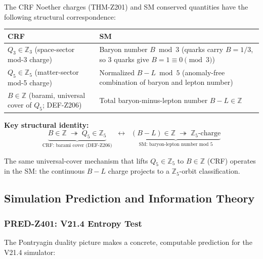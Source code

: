 \documentclass[12pt, a4paper]{article}
\begin{document}
\begin{keybox}[title={Conservation Law Identification (ID-Z401)}]
The CRF Noether charges (THM-Z201) and SM conserved quantities
have the following structural correspondence:

{\small
\renewcommand{\arraystretch}{1.30}
\begin{tabular}{p{4cm} p{7.5cm}}
\toprule
\textbf{CRF} & \textbf{SM}\\
\midrule
$Q_3 \in \mathbb{Z}_3$ (space-sector mod-3 charge)
  & Baryon number $B \bmod 3$
    (quarks carry $B = 1/3$, so 3 quarks give
    $B = 1 \equiv 0 \pmod{3}$) \\[4pt]
$Q_5 \in \mathbb{Z}_5$ (matter-sector mod-5 charge)
  & Normalized $B-L \bmod 5$
    (anomaly-free combination of baryon and lepton number) \\[4pt]
$B \in \mathbb{Z}$ (barami, universal cover of $Q_5$; DEF-Z206)
  & Total baryon-minus-lepton number $B-L \in \mathbb{Z}$ \\
\bottomrule
\end{tabular}
}

\textbf{Key structural identity:}
$$\underbrace{B \in \mathbb{Z} \;\twoheadrightarrow\; Q_5 \in \mathbb{Z}_5}_{\text{CRF: barami cover (DEF-Z206)}}
\;\;\longleftrightarrow\;\;
\underbrace{(B-L) \in \mathbb{Z} \;\twoheadrightarrow\; \mathbb{Z}_5\text{-charge}}_{\text{SM: baryon-lepton number mod 5}}$$

The same universal-cover mechanism that lifts $Q_5 \in \mathbb{Z}_5$
to $B \in \mathbb{Z}$ (CRF) operates in the SM: the continuous
$B-L$ charge projects to a $\mathbb{Z}_5$-orbit classification.
\end{keybox}

\subsection{Simulation Prediction and Information Theory}
\label{sec:prediction}

\subsubsection{PRED-Z401: V21.4 Entropy Test}

The Pontryagin duality picture makes a concrete, computable
prediction for the V21.4 simulator:
\end{document}
